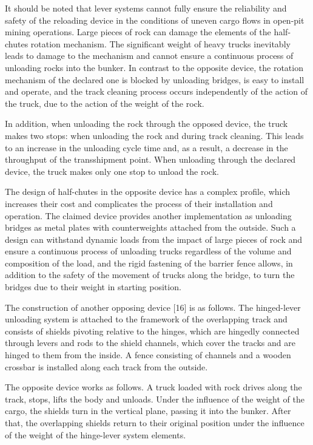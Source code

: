 It should be noted that lever systems cannot fully ensure the
reliability and safety of the reloading device in the conditions of
uneven cargo flows in open-pit mining operations. Large pieces of rock
can damage the elements of the half-chutes rotation mechanism. The
significant weight of heavy trucks inevitably leads to damage to the
mechanism and cannot ensure a continuous process of unloading rocks into
the bunker. In contrast to the opposite device, the rotation mechanism
of the declared one is blocked by unloading bridges, is easy to install
and operate, and the track cleaning process occurs independently of the
action of the truck, due to the action of the weight of the rock.

In addition, when unloading the rock through the opposed device, the
truck makes two stops: when unloading the rock and during track
cleaning. This leads to an increase in the unloading cycle time and, as
a result, a decrease in the throughput of the transshipment point. When
unloading through the declared device, the truck makes only one stop to
unload the rock.

The design of half-chutes in the opposite device has a complex profile,
which increases their cost and complicates the process of their
installation and operation. The claimed device provides another
implementation as unloading bridges as metal plates with counterweights
attached from the outside. Such a design can withstand dynamic loads
from the impact of large pieces of rock and ensure a continuous process
of unloading trucks regardless of the volume and composition of the
load, and the rigid fastening of the barrier fence allows, in addition
to the safety of the movement of trucks along the bridge, to turn the
bridges due to their weight in starting position.

The construction of another opposing device {[}16{]} is as follows. The
hinged-lever unloading system is attached to the framework of the
overlapping track and consists of shields pivoting relative to the
hinges, which are hingedly connected through levers and rods to the
shield channels, which cover the tracks and are hinged to them from the
inside. A fence consisting of channels and a wooden crossbar is
installed along each track from the outside.

The opposite device works as follows. A truck loaded with rock drives
along the track, stops, lifts the body and unloads. Under the influence
of the weight of the cargo, the shields turn in the vertical plane,
passing it into the bunker. After that, the overlapping shields return
to their original position under the influence of the weight of the
hinge-lever system elements.

